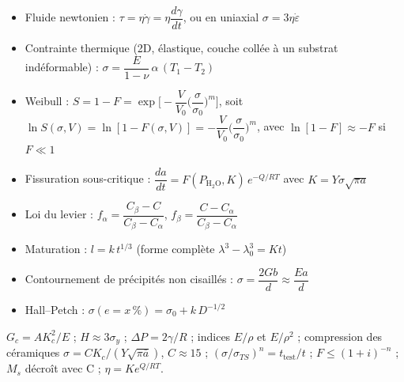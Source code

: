 \begin{keybox}[title=Chapitre 2 --- Les céramiques]
\begin{itemize}
  \item Fluide newtonien : $\tau = \eta\dot\gamma = \eta\dfrac{d\gamma}{dt}$, ou en uniaxial
        $\sigma = 3\eta\dot\varepsilon$
  \item Contrainte thermique (2D, élastique, couche collée à un substrat indéformable) :
        $\sigma = \dfrac{E}{1-\nu}\,\alpha\,(T_1 - T_2)$
  \item Weibull : $S = 1 - F = \exp\!\Big[-\dfrac{V}{V_0}\Big(\dfrac{\sigma}{\sigma_0}\Big)^m\Big]$,
        soit $\ln S(\sigma,V) = \ln[1 - F(\sigma,V)] = -\dfrac{V}{V_0}\Big(\dfrac{\sigma}{\sigma_0}\Big)^m$,
        avec $\ln[1-F] \approx -F$ si $F \ll 1$
  \item Fissuration sous-critique : $\dfrac{da}{dt} = F(P_{\text{H}_2\text{O}}, K)\,e^{-Q/RT}$ avec
        $K = Y\sigma\sqrt{\pi a}$
\end{itemize}
\end{keybox}

\begin{keybox}[title={Chapitre 3 --- Métaux et alliages 1 : Al \& Cu}]
\begin{itemize}
  \item Loi du levier : $f_\alpha = \dfrac{C_\beta - C}{C_\beta - C_\alpha}$,
        $f_\beta = \dfrac{C - C_\alpha}{C_\beta - C_\alpha}$
  \item Maturation : $l = k\,t^{1/3}$ (forme complète $\lambda^3 - \lambda_0^3 = Kt$)
  \item Contournement de précipités non cisaillés : $\sigma = \dfrac{2Gb}{d} \approx \dfrac{Ea}{d}$
\end{itemize}
\end{keybox}

\begin{keybox}[title={Chapitre 4 --- Le fer et ses alliages}]
\begin{itemize}
  \item Hall--Petch : $\sigma(e = x\,\%) = \sigma_0 + k\,D^{-1/2}$
\end{itemize}
\end{keybox}

\begin{rembox}[title={À savoir aussi, même si ce n'est pas dans la liste}]
$G_c = AK_c^2/E$ ; $H \approx 3\sigma_y$ ; $\Delta P = 2\gamma/R$ ; indices $E/\rho$ et
$E/\rho^2$ ; compression des céramiques $\sigma = CK_c/(Y\sqrt{\pi\bar a})$, $C \approx 15$ ;
$(\sigma/\sigma_{TS})^n = t_{\text{test}}/t$ ; $F \le (1+i)^{-n}$ ; $M_s$ décroît avec C ;
$\eta = Ke^{Q/RT}$.
\end{rembox}

